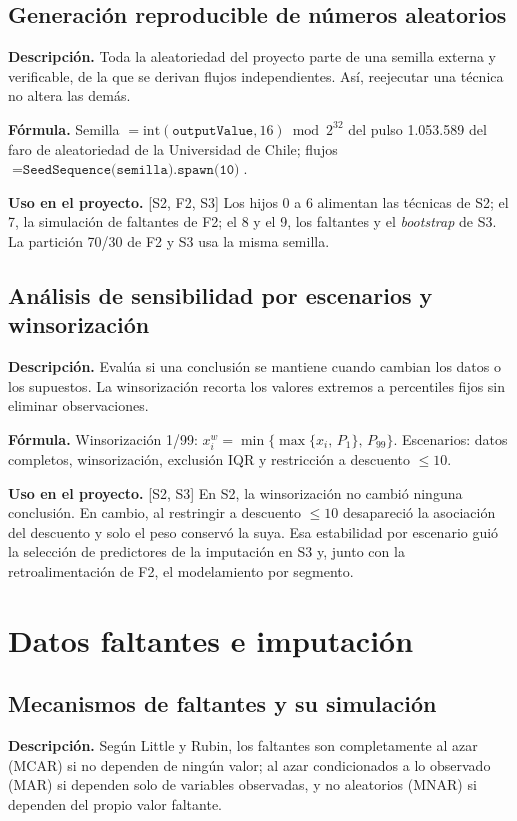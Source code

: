 \documentclass[11pt,a4paper]{article}
\newcommand{\desc}{\textbf{Descripción.} }
\newcommand{\formula}{\textbf{Fórmula.} }
\newcommand{\uso}{\textbf{Uso en el proyecto.} }
\newcommand{\fase}[1]{{\footnotesize\color{gris}[#1]}}
\begin{document}
\subsection{Generación reproducible de números aleatorios}
\desc Toda la aleatoriedad del proyecto parte de una semilla externa y verificable, de la que se derivan flujos independientes. Así, reejecutar una técnica no altera las demás.

\formula Semilla $=\mathrm{int}(\texttt{outputValue},16)\bmod 2^{32}$ del pulso 1.053.589 del faro de aleatoriedad de la Universidad de Chile; flujos $=\texttt{SeedSequence(semilla).spawn(10)}$.

\uso \fase{S2, F2, S3} Los hijos 0 a 6 alimentan las técnicas de S2; el 7, la simulación de faltantes de F2; el 8 y el 9, los faltantes y el \emph{bootstrap} de S3. La partición 70/30 de F2 y S3 usa la misma semilla.

\subsection{Análisis de sensibilidad por escenarios y winsorización}
\desc Evalúa si una conclusión se mantiene cuando cambian los datos o los supuestos. La winsorización recorta los valores extremos a percentiles fijos sin eliminar observaciones.

\formula Winsorización 1/99: $x_i^{w}=\min\{\max\{x_i,\,P_{1}\},\,P_{99}\}$. Escenarios: datos completos, winsorización, exclusión IQR y restricción a descuento $\le10$.

\uso \fase{S2, S3} En S2, la winsorización no cambió ninguna conclusión. En cambio, al restringir a descuento $\le10$ desapareció la asociación del descuento y solo el peso conservó la suya. Esa estabilidad por escenario guió la selección de predictores de la imputación en S3 y, junto con la retroalimentación de F2, el modelamiento por segmento.

\section{Datos faltantes e imputación}\label{sec:faltantes}

\subsection{Mecanismos de faltantes y su simulación}
\desc Según Little y Rubin, los faltantes son completamente al azar (MCAR) si no dependen de ningún valor; al azar condicionados a lo observado (MAR) si dependen solo de variables observadas, y no aleatorios (MNAR) si dependen del propio valor faltante.
\end{document}
